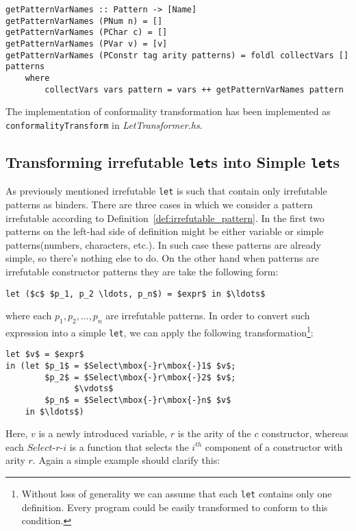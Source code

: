 \documentclass[12pt,a4paper]{report}
\begin{document}
\hspace*{-1.5in}
\begin{lstlisting}[style=haskell]
getPatternVarNames :: Pattern -> [Name]
getPatternVarNames (PNum n) = []
getPatternVarNames (PChar c) = []
getPatternVarNames (PVar v) = [v]
getPatternVarNames (PConstr tag arity patterns) = foldl collectVars [] patterns
    where
        collectVars vars pattern = vars ++ getPatternVarNames pattern
\end{lstlisting}

The implementation of conformality transformation has been implemented as
\texttt{conformalityTransform} in \textit{LetTransformer.hs}.

\subsection{Transforming irrefutable \texttt{let}s into Simple \texttt{let}s}
As previously mentioned irrefutable \texttt{let} is such that contain only
irrefutable patterns as binders. There are three cases in which we consider a
pattern irrefutable according to Definition~\ref{def:irrefutable_pattern}. In
the first two patterns on the left-had side of definition might be either
variable or simple patterns(numbers, characters, etc.). In such case these
patterns are already simple, so there's nothing else to do. On the other hand
when patterns are irrefutable constructor patterns they are take the following
form:

\hspace*{-1.5in}
\begin{lstlisting}[style=haskell,mathescape=true]
  let ($c$ $p_1, p_2 \ldots, p_n$) = $expr$ in $\ldots$
\end{lstlisting}
where each $p_1, p_2, \ldots, p_n$ are irrefutable patterns. In order to
convert such expression into a simple \texttt{let}, we can apply the following
transformation\footnote{Without loss of generality we can assume that each
\texttt{let} contains only one definition. Every program could be easily
transformed to conform to this condition.}:

\hspace*{-1.5in}
\begin{lstlisting}[style=haskell,mathescape=true]
let $v$ = $expr$
in (let $p_1$ = $Select\mbox{-}r\mbox{-}1$ $v$;
        $p_2$ = $Select\mbox{-}r\mbox{-}2$ $v$;
              $\vdots$
        $p_n$ = $Select\mbox{-}r\mbox{-}n$ $v$
    in $\ldots$)
\end{lstlisting}
Here, $v$ is a newly introduced variable, $r$ is the arity of the $c$
constructor, whereas each $Select\mbox{-}r\mbox{-}i$ is a function that selects
the $i^{th}$ component of a constructor with arity $r$. Again a simple example
should clarify this:
\end{document}
